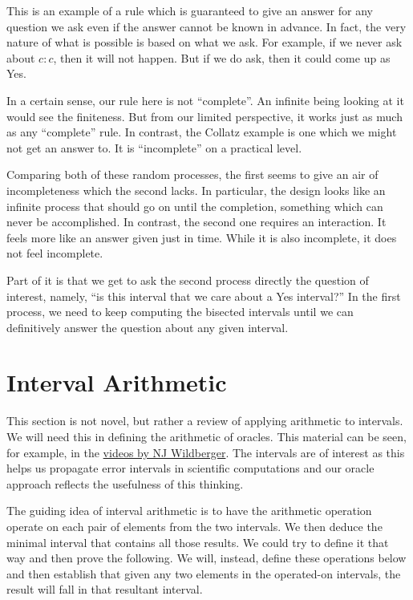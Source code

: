 \documentclass[12pt]{article}
\theoremstyle{remark}
\begin{document}
This is an example of a rule which is guaranteed to give an answer for any question we ask even if the answer cannot be known in advance. In fact, the very nature of what is possible is based on what we ask. For example, if we never ask about  $c:c$, then it will not happen. But if we do ask, then it could come up as Yes. 

In a certain sense, our rule here is not ``complete''. An infinite being looking at it would see the finiteness. But from our limited perspective, it works just as much as any ``complete'' rule. In contrast, the Collatz example is one which we might not get an answer to. It is ``incomplete'' on a practical level. 

Comparing both of these random processes, the first seems to give an air of incompleteness which the second lacks. In particular, the design looks like an infinite process that should go on until the completion, something which can never be accomplished. In contrast, the second one requires an interaction. It feels more like an answer given just in time. While it is also incomplete, it does not feel incomplete. 

Part of it is that we get to ask the second process directly the question of interest, namely, ``is this interval that we care about a Yes interval?'' In the first process, we need to keep computing the bisected intervals until we can definitively answer the question about any given interval. 

\section{Interval Arithmetic}

This section is not novel, but rather a review of applying arithmetic to intervals. We will need this in defining the arithmetic of oracles. This material can be seen, for example, in the \href{https://cosmolearning.org/video-lectures/measurement-approximation-interval-arithmetic-i/}{videos by NJ Wildberger}. The intervals are of interest as this helps us propagate error intervals in scientific computations and our oracle approach reflects the usefulness of this thinking. 

The guiding idea of interval arithmetic is to have the arithmetic operation operate on each pair of elements from the two intervals. We then deduce the minimal interval that contains all those results. We could try to define it that way and then prove the following. We will, instead, define these operations below and then establish that given any two elements in the operated-on intervals, the result will fall in that resultant interval. 
\end{document}
